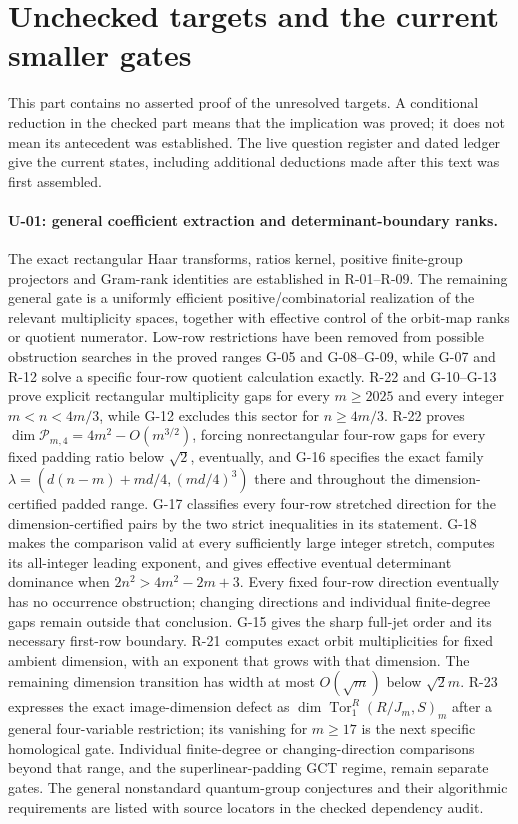 \section{Unchecked targets and the current smaller gates}

This part contains no asserted proof of the unresolved targets. A conditional reduction in the checked part means that the implication was proved; it does not mean its antecedent was established. The live question register and dated ledger give the current states, including additional deductions made after this text was first assembled.

\paragraph{U-01: general coefficient extraction and determinant-boundary ranks.}
The exact rectangular Haar transforms, ratios kernel, positive finite-group projectors and Gram-rank identities are established in R-01--R-09. The remaining general gate is a uniformly efficient positive/combinatorial realization of the relevant multiplicity spaces, together with effective control of the orbit-map ranks or quotient numerator. Low-row restrictions have been removed from possible obstruction searches in the proved ranges G-05 and G-08--G-09, while G-07 and R-12 solve a specific four-row quotient calculation exactly. R-22 and G-10--G-13 prove explicit rectangular multiplicity gaps for every $m\geq2025$ and every integer $m<n<4m/3$, while G-12 excludes this sector for $n\geq4m/3$. R-22 proves $\dim\mathcal P_{m,4}=4m^2-O(m^{3/2})$, forcing nonrectangular four-row gaps for every fixed padding ratio below $\sqrt2$, eventually, and G-16 specifies the exact family $\lambda=(d(n-m)+md/4,(md/4)^3)$ there and throughout the dimension-certified padded range. G-17 classifies every four-row stretched direction for the dimension-certified pairs by the two strict inequalities in its statement. G-18 makes the comparison valid at every sufficiently large integer stretch, computes its all-integer leading exponent, and gives effective eventual determinant dominance when $2n^2>4m^2-2m+3$. Every fixed four-row direction eventually has no occurrence obstruction; changing directions and individual finite-degree gaps remain outside that conclusion. G-15 gives the sharp full-jet order and its necessary first-row boundary. R-21 computes exact orbit multiplicities for fixed ambient dimension, with an exponent that grows with that dimension. The remaining dimension transition has width at most $O(\sqrt m)$ below $\sqrt2m$. R-23 expresses the exact image-dimension defect as $\dim\operatorname{Tor}_1^R(R/J_m,S)_m$ after a general four-variable restriction; its vanishing for $m\geq17$ is the next specific homological gate. Individual finite-degree or changing-direction comparisons beyond that range, and the superlinear-padding GCT regime, remain separate gates. The general nonstandard quantum-group conjectures and their algorithmic requirements are listed with source locators in the checked dependency audit.

